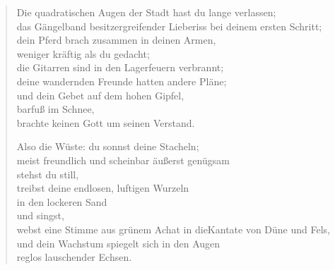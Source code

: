 
\cleartoverso


\begin{verse}

Die quadratischen Augen der Stadt hast du lange verlassen;\\
das Gängelband besitzergreifender Liebe\verselinebreak riss bei deinem ersten Schritt;\\
dein Pferd brach zusammen in deinen Armen,\\
weniger kräftig als du gedacht;\\
die Gitarren sind in den Lagerfeuern verbrannt;\\
deine wandernden Freunde hatten andere Pläne;\\
und dein Gebet auf dem hohen Gipfel,\\
barfuß im Schnee,\\
brachte keinen Gott um seinen Verstand.

Also die Wüste: du sonnst deine Stacheln;\\
meist freundlich und scheinbar äußerst genügsam\\
stehst du still,\\
treibst deine endlosen, luftigen Wurzeln\\
in den lockeren Sand\\
und singst,\\
webst eine Stimme aus grünem Achat in die\verselinebreak Kantate von Düne und Fels,\\
und dein Wachstum spiegelt sich in den Augen\\
reglos lauschender Echsen.

\end{verse}

\clearpage


